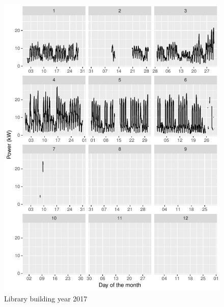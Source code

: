 \documentclass[11pt, oneside]{article}   	%
\begin{document}
\begin{figure}
\includegraphics[keepaspectratio]{library_build_Y2017.pdf}
\caption{Library building year 2017 }
\end{figure}
\clearpage
\end{document}

